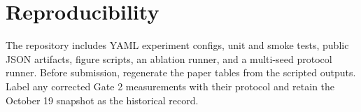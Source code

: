 \documentclass[11pt]{article}
\begin{document}
\section{Reproducibility}

The repository includes YAML experiment configs, unit and smoke tests, public JSON artifacts, figure scripts, an ablation runner, and a multi-seed protocol runner.
Before submission, regenerate the paper tables from the scripted outputs. Label any corrected Gate 2 measurements with their protocol and retain the October 19 snapshot as the historical record.



\end{document}
